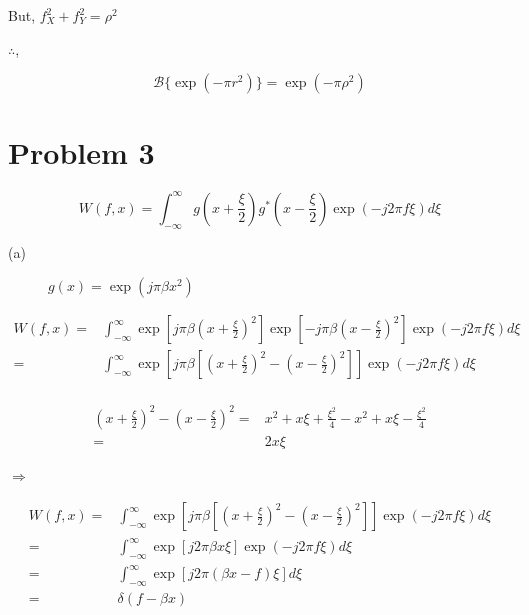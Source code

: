 \documentclass[a4paper,11pt]{article}
\begin{document}
But, \(f_X^2+f_Y^2=\rho^2\)

\(\therefore\),

$$\mathcal{B}\{\exp(-\pi r^2)\} = \exp(-\pi \rho^2) $$

\newpage
\section*{Problem 3}
\label{sec:org2b24e3a}
\begin{equation}
W(f,x) = \int_{-\infty}^{\infty} g(x+\frac{\xi}{2})g^*(x-\frac{\xi}{2})\exp(-j2\pi f\xi) d\xi
\end{equation}
\begin{description}
\item[{(a)}] \(g(x) = \exp(j\pi \beta x^2)\)
\end{description}

\begin{equation*}
\begin{split}
W(f,x) = & \int_{-\infty}^{\infty} \exp\left[j\pi\beta \left(x+\frac{\xi}{2}\right)^2\right]\exp\left[-j\pi\beta \left(x-\frac{\xi}{2}\right)^2\right]\exp(-j2\pi f\xi) d\xi \\
= & \int_{-\infty}^{\infty} \exp\left[j\pi\beta \left[\left(x+\frac{\xi}{2}\right)^2 - \left(x-\frac{\xi}{2}\right)^2\right]\right]\exp(-j2\pi f\xi) d\xi \\
\end{split}
\end{equation*}

\begin{equation*}
\begin{split}
\left(x+\frac{\xi}{2}\right)^2 - \left(x-\frac{\xi}{2}\right)^2 = & x^2+x\xi + \frac{\xi^2}{4} - x^2+x\xi - \frac{\xi^2}{4} \\
= & 2x\xi
\end{split}
\end{equation*}

\(\Rightarrow\)

\begin{equation*}
\begin{split}
W(f,x) = & \int_{-\infty}^{\infty} \exp\left[j\pi \beta \left[\left(x+\frac{\xi}{2}\right)^2 - \left(x-\frac{\xi}{2}\right)^2\right]\right]\exp(-j2\pi f\xi) d\xi \\
 = & \int_{-\infty}^{\infty} \exp\left[j2\pi \beta x\xi\right]\exp(-j2\pi f\xi) d\xi \\
 = & \int_{-\infty}^{\infty} \exp\left[j2\pi(\beta x-f)\xi\right] d\xi \\
 = & \delta(f-\beta x)
\end{split}
\end{equation*}
\end{document}
